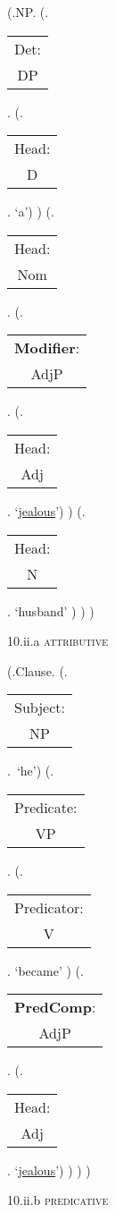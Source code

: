 \documentclass[12pt,letterpaper]{article}
\begin{document}
\begin{figure}
	\begin{center}
		\begin{parsetree}	
			(.NP.
			(.\begin{tabular}{c}Det:\\DP\end{tabular}. 
			(.\begin{tabular}{c}Head:\\D\end{tabular}.  `a')
			)
			(.\begin{tabular}{c}Head:\\Nom\end{tabular}. 
			(.\begin{tabular}{c}\textbf{Modifier}:\\AdjP\end{tabular}. 
			(.\begin{tabular}{c}Head:\\Adj\end{tabular}.  `\underline{jealous}')
			)
			(.\begin{tabular}{c}Head:\\N\end{tabular}.  `husband' )
			)
			)
			
			\hfill \break\hfill \break
		\end{parsetree}
		10.ii.a \textsc{attributive}
	\end{center}
\end{figure}
\begin{figure}
	\begin{center}
		\begin{parsetree}
			(.Clause.
			(.\begin{tabular}{c}Subject:\\NP\end{tabular}.~`he')
			(.\begin{tabular}{c}Predicate:\\VP\end{tabular}.
			(.\begin{tabular}{c}Predicator:\\V\end{tabular}. `became' )
			(.\begin{tabular}{c}\textbf{PredComp}:\\AdjP\end{tabular}.  (.\begin{tabular}{c}Head:\\Adj\end{tabular}. `\underline{jealous}')
			)
			)
			)
			
			\hfill \break\hfill \break
		\end{parsetree}
		10.ii.b \textsc{predicative}
	\end{center}
\end{figure}
\end{document}
